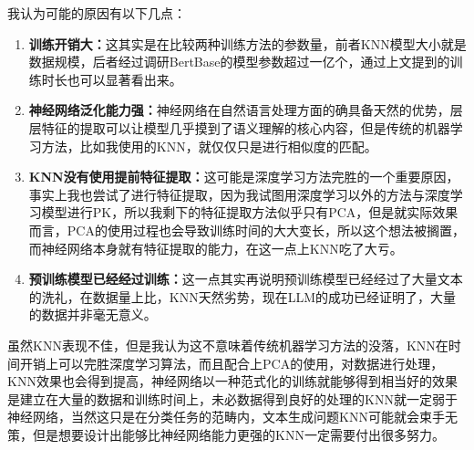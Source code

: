 \documentclass{article}
\begin{document}
	我认为可能的原因有以下几点：
	\begin{enumerate}
		\item \textbf{训练开销大：}这其实是在比较两种训练方法的参数量，前者KNN模型大小就是数据规模，后者经过调研BertBase的模型参数超过一亿个，通过上文提到的训练时长也可以显著看出来。
		
		\item \textbf{神经网络泛化能力强：}神经网络在自然语言处理方面的确具备天然的优势，层层特征的提取可以让模型几乎摸到了语义理解的核心内容，但是传统的机器学习方法，比如我使用的KNN，就仅仅只是进行相似度的匹配。
		
		\item \textbf{KNN没有使用提前特征提取：}这可能是深度学习方法完胜的一个重要原因，事实上我也尝试了进行特征提取，因为我试图用深度学习以外的方法与深度学习模型进行PK，所以我剩下的特征提取方法似乎只有PCA，但是就实际效果而言，PCA的使用过程也会导致训练时间的大大变长，所以这个想法被搁置，而神经网络本身就有特征提取的能力，在这一点上KNN吃了大亏。
		
		\item \textbf{预训练模型已经经过训练：}这一点其实再说明预训练模型已经经过了大量文本的洗礼，在数据量上比，KNN天然劣势，现在LLM的成功已经证明了，大量的数据并非毫无意义。
	\end{enumerate}
	虽然KNN表现不佳，但是我认为这不意味着传统机器学习方法的没落，KNN在时间开销上可以完胜深度学习算法，而且配合上PCA的使用，对数据进行处理，KNN效果也会得到提高，神经网络以一种范式化的训练就能够得到相当好的效果是建立在大量的数据和训练时间上，未必数据得到良好的处理的KNN就一定弱于神经网络，当然这只是在分类任务的范畴内，文本生成问题KNN可能就会束手无策，但是想要设计出能够比神经网络能力更强的KNN一定需要付出很多努力。
\end{document}
